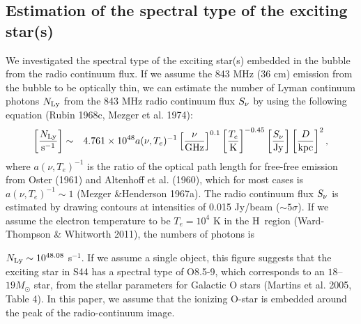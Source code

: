 \documentclass[onecolumn]{pasj01}
\begin{document}
{{{{{{\subsection{{Estimation of the} spectral type of the exciting star(s)}
We investigated the spectral type of the exciting star(s) embedded {in} the bubble from the radio continuum flux.
If we assume {the} 843 MHz (36 cm) {emission from the bubble} {to be} optically thin, we can estimate {the number of} Lyman continuum photon{s} $N_{\rm Ly}$ from the 843 MHz radio continuum flux $S_{\rm \nu}$ by using {the} following equation (Rubin 1968c, Mezger et al. 1974):
\begin{eqnarray}
\left[{N_{\rm Ly} \over {\rm s}^{-1}}\right] &\sim& 4.761 \times 10^{48} a(\nu, T_e)^{-1} \left[{\nu \over {\rm GHz}}\right]^{0.1}  \left[{T_e \over {\rm K}}\right]^{-0.45} \left[{S_{\nu} \over {\rm Jy} }\right] \left[{D \over {\rm kpc} }\right]^2,
\label{eq:75}
\end{eqnarray}
{where} $a(\nu, T_e)^{-1} $ is {the} ratio of the optical path length for free-free emission from Oster (1961) and Altenhoff et al. (1960), which {for} most cases {is} $a(\nu, T_e)^{-1}  \sim 1$ (Mezger \&Henderson 1967a). 
The {radio continuum} flux $S_{\rm \nu}$ is estimated by drawing contours at intensities of {0.015 Jy/beam ($\sim 5\sigma$).}
If we assume the electron temperature {to be} $T_e=10^4$ K in the H\, region ({Ward-Thompson \& Whitworth 2011}), the {numbers of photons} is  {$N_{\rm Ly} \sim 10^{48.08}$ s$^{-1}$.
{If we {assume} a single object, this figure {suggests} that {the} exciting star {in} S44 has a spectral type of O8.5-9, which {corresponds to} {an} $18$--$19 M_{\odot}$ star, from the stellar parameter{s for} Galactic O stars (Martins et al. 2005, Table 4).} {In this paper, we assume that the ionizing O-star is embedded around the peak of the radio-continuum image.}

}}}}}}}
\end{document}

